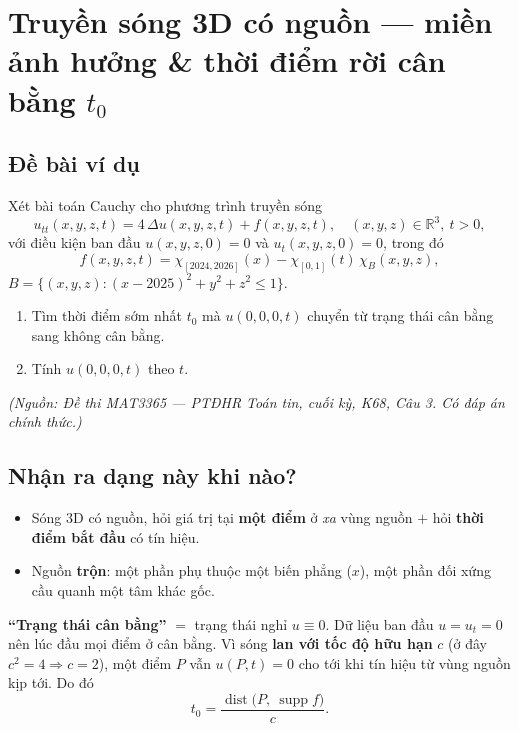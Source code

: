
\section{Truyền sóng 3D có nguồn --- miền ảnh hưởng \& thời điểm rời cân bằng $t_0$}

\subsection*{Đề bài ví dụ}

Xét bài toán Cauchy cho phương trình truyền sóng
\[
  u_{tt}(x,y,z,t)=4\,\Delta u(x,y,z,t)+f(x,y,z,t),\quad (x,y,z)\in\mathbb{R}^3,\ t>0,
\]
với điều kiện ban đầu $u(x,y,z,0)=0$ và $u_t(x,y,z,0)=0$, trong đó
\[
  f(x,y,z,t)=\chi_{[2024,2026]}(x)-\chi_{[0,1]}(t)\,\chi_B(x,y,z),
\]
$B=\{(x,y,z):(x-2025)^2+y^2+z^2\le1\}$.

\begin{enumerate}
\item[(a)] Tìm thời điểm sớm nhất $t_0$ mà $u(0,0,0,t)$ chuyển từ trạng thái cân bằng sang không cân bằng.
\item[(b)] Tính $u(0,0,0,t)$ theo $t$.
\end{enumerate}

\emph{\small(Nguồn: Đề thi MAT3365 --- PTĐHR Toán tin, cuối kỳ, K68, Câu 3. Có đáp án chính thức.)}

\subsection*{Nhận ra dạng này khi nào?}

\begin{itemize}
\item Sóng 3D có nguồn, hỏi giá trị tại \textbf{một điểm} ở \emph{xa} vùng nguồn $+$ hỏi \textbf{thời điểm bắt đầu} có tín hiệu.
\item Nguồn \textbf{trộn}: một phần phụ thuộc một biến phẳng ($x$), một phần đối xứng cầu quanh một tâm khác gốc.
\end{itemize}

\begin{luuybox}
\textbf{``Trạng thái cân bằng''} $=$ trạng thái nghỉ $u\equiv0$. Dữ liệu ban đầu $u=u_t=0$ nên lúc đầu mọi điểm ở cân bằng.
Vì sóng \textbf{lan với tốc độ hữu hạn} $c$ (ở đây $c^2=4\Rightarrow c=2$), một điểm $P$ vẫn $u(P,t)=0$ cho tới khi tín hiệu từ vùng nguồn kịp tới. Do đó
\[
  t_0=\frac{\operatorname{dist}\big(P,\ \operatorname{supp} f\big)}{c}.
\]
\end{luuybox}

